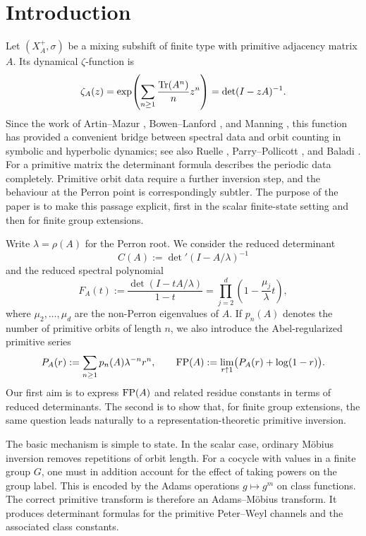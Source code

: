 \section{Introduction}\label{sec:introduction}

Let \((X_A^+,\sigma)\) be a mixing subshift of finite type with
primitive adjacency matrix \(A\). Its dynamical \(\zeta\)-function is
\[
  \zeta_A(z)
  =\exp\!\left(\sum_{n\ge 1}\frac{\operatorname{Tr}(A^n)}{n}z^n\right)
  =\det(I-zA)^{-1}.
\]
Since the work of Artin--Mazur \cite{ArtinMazur1965PeriodicPoints},
Bowen--Lanford \cite{BowenLanford1970Zeta}, and Manning
\cite{Manning1971Axiom}, this function has provided a convenient bridge
between spectral data and orbit counting in symbolic and hyperbolic
dynamics; see also Ruelle
\cite{Ruelle1976ZetaExpanding,Ruelle1978Thermodynamic},
Parry--Pollicott \cite{ParryPollicott1990Zeta}, and Baladi
\cite{Baladi2000PositiveTransfer,Baladi2018ZetaDeterminants}. For a
primitive matrix the determinant formula describes the periodic data
completely. Primitive orbit data require a further inversion step, and
the behaviour at the Perron point is correspondingly subtler. The
purpose of the paper is to make this passage explicit, first in the
scalar finite-state setting and then for finite group extensions.

Write \(\lambda=\rho(A)\) for the Perron root. We consider the reduced
determinant
\[
  C(A):=\det\nolimits'(I-A/\lambda)^{-1}
\]
and the reduced spectral polynomial
\[
  F_A(t):=\frac{\det(I-tA/\lambda)}{1-t}
  =\prod_{j=2}^d\left(1-\frac{\mu_j}{\lambda}t\right),
\]
where \(\mu_2,\dots,\mu_d\) are the non-Perron eigenvalues of \(A\). If
\(p_n(A)\) denotes the number of primitive orbits of length \(n\), we
also introduce the Abel-regularized primitive series
\[
  P_A(r):=\sum_{n\ge 1}p_n(A)\lambda^{-n}r^n,
  \qquad
  \operatorname{FP}(A):=\lim_{r\uparrow 1}\bigl(P_A(r)+\log(1-r)\bigr).
\]
Our first aim is to express \(\operatorname{FP}(A)\) and related residue constants in
terms of reduced determinants. The second is to show that, for finite
group extensions, the same question leads naturally to a
representation-theoretic primitive inversion.

The basic mechanism is simple to state. In the scalar case, ordinary
M\"obius inversion removes repetitions of orbit length. For a cocycle
with values in a finite group \(G\), one must in addition account for
the effect of taking powers on the group label. This is encoded by the
Adams operations \(g\mapsto g^m\) on class functions. The correct
primitive transform is therefore an Adams--M\"obius transform. It
produces determinant formulas for the primitive Peter--Weyl channels and
the associated class constants.

